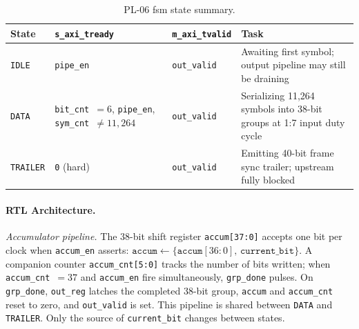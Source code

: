 \begin{table}[htbp]
  \caption{PL-06 \ac{fsm} state summary.}
  \label{tab:pl06_fsm}
  \centering
  \small
  \begin{tabular}{lp{4.0cm}lp{6.5cm}}
    \hline
    State             & \texttt{s\_axi\_tready}      & \texttt{m\_axi\_tvalid} & Task \\
    \hline
    \texttt{IDLE}     & \texttt{pipe\_en}             & \texttt{out\_valid}
                      & Awaiting first symbol; output pipeline may still be draining \\[4pt]
    \texttt{DATA}     & \texttt{bit\_cnt}~$= 6$,
                        \texttt{pipe\_en},
                        \texttt{sym\_cnt}~$\neq 11{,}264$
                      & \texttt{out\_valid}
                      & Serializing 11{,}264 symbols into 38-bit groups at 1:7 input duty cycle \\[4pt]
    \texttt{TRAILER}  & \texttt{0} (hard)
                      & \texttt{out\_valid}
                      & Emitting 40-bit frame sync trailer; upstream fully blocked \\
    \hline
  \end{tabular}
\end{table}


\FloatBarrier
\paragraph{RTL Architecture.}

\textit{Accumulator pipeline.}
The 38-bit shift register \texttt{accum[37:0]} accepts one bit per clock
when \texttt{accum\_en} asserts:
$\mathtt{accum} \leftarrow \{\mathtt{accum}[36:0],\,\mathtt{current\_bit}\}$.
A companion counter \texttt{accum\_cnt[5:0]} tracks the number of bits
written; when \texttt{accum\_cnt}~$= 37$ and \texttt{accum\_en} fire
simultaneously, \texttt{grp\_done} pulses.
On \texttt{grp\_done}, \texttt{out\_reg} latches the completed 38-bit group,
\texttt{accum} and \texttt{accum\_cnt} reset to zero, and \texttt{out\_valid}
is set.
This pipeline is shared between \texttt{DATA} and \texttt{TRAILER}. Only the
source of \texttt{current\_bit} changes between states.

